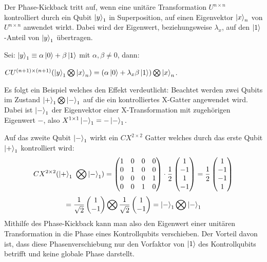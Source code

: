 Der Phase-Kickback tritt auf,
wenn eine unitäre Transformation \(U^{n\times n}\) kontrolliert durch ein Qubit \(\ket{y}_1\) in Superposition, 
auf einen Eigenvektor \(\ket{x}_n\) von \(U^{n\times n}\) anwendet wirkt.
Dabei wird der Eigenwert, beziehungsweise \(\lambda_x\), auf den \(\ket{1}\)-Anteil von \(\ket{y}_1\)
übertragen.

Sei: \(\ket{y}_1 \equiv \alpha\ket{0} + \beta\ket{1}\) mit \(\alpha,\beta \neq 0\), 
dann:

\(CU^{(n+1)\times (n+1)}(\ket{y}_1\bigotimes\ket{x}_n)=(\alpha\ket{0} + \lambda_x\beta\ket{1})\bigotimes\ket{x}_n\).

Es folgt ein Beispiel welches den Effekt verdeutlicht:
Beachtet werden zwei Qubits im Zustand \(\ket{+}_1 \bigotimes \ket{-}_1\) auf die ein kontrolliertes X-Gatter angewendet wird.
Dabei ist \(\ket{-}_1\) der Eigenvektor einer X-Transformation mit zugehörigen Eigenwert \(-\), also \(X^{1\times 1}\ket{-}_1=-\ket{-}_1\).

Auf das zweite Qubit \(\ket{-}_1\) wirkt ein \(CX^{2\times 2}\) Gatter welches durch das erste Qubit \(\ket{+}_1\) kontrolliert wird:
\[
  CX^{2\times 2}( \ket{+}_1\ \bigotimes \ket{-}_1) =
  \begin{pmatrix}
    1 & 0 & 0 & 0\\
    0 & 1 & 0 & 0\\
    0 & 0 & 0 & 1\\
    0 & 0 & 1 & 0
  \end{pmatrix}
  \cdot
  \frac{1}{{2}}
  \begin{pmatrix}
    1 \\
    -1 \\
    1 \\
    -1 
  \end{pmatrix}
  =
  \frac{1}{{2}}
  \begin{pmatrix}
    1 \\
    -1 \\
    -1 \\
    1 
  \end{pmatrix}
  \]
  \[
  =
  \frac{1}{{\sqrt{2}}}
  \begin{pmatrix}
    1 \\
    -1 
  \end{pmatrix}
  \bigotimes
  \frac{1}{{\sqrt{2}}}
  \begin{pmatrix}
    1 \\
    -1 
  \end{pmatrix}
  =
  \ket{-}_1 \bigotimes \ket{-}_1
  \]
Mithilfe des Phase-Kickback kann man also den Eigenwert einer unitären Transformation in die Phase eines Kontrollqubits verschieben.
Der Vorteil davon ist, dass diese Phasenverschiebung nur den Vorfaktor von \(\ket{1}\) des Kontrollqubits betrifft und keine globale Phase darstellt.

